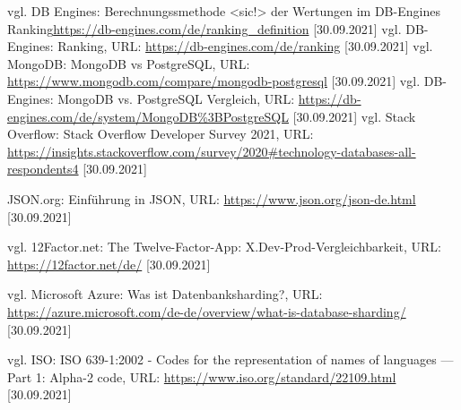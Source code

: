 \begin{thebibliography}{2}
         vgl. DB Engines: Berechnungssmethode <sic!> der Wertungen im DB-Engines Ranking\url{https://db-engines.com/de/ranking_definition} [30.09.2021]
         vgl. DB-Engines: Ranking, URL: \url{https://db-engines.com/de/ranking} [30.09.2021]
         vgl. MongoDB: MongoDB vs PostgreSQL, URL: \url{https://www.mongodb.com/compare/mongodb-postgresql} [30.09.2021]
         vgl. DB-Engines: MongoDB vs. PostgreSQL Vergleich, URL: \url{https://db-engines.com/de/system/MongoDB%3BPostgreSQL} [30.09.2021]
         vgl. Stack Overflow: Stack Overflow Developer Survey 2021, URL: \url{https://insights.stackoverflow.com/survey/2020#technology-databases-all-respondents4} [30.09.2021]
        
         JSON.org: Einführung in JSON, URL: \url{https://www.json.org/json-de.html} [30.09.2021]

         vgl. 12Factor.net: The Twelve-Factor-App: X.Dev-Prod-Vergleichbarkeit, URL: \url{https://12factor.net/de/} [30.09.2021]

         vgl. Microsoft Azure: Was ist Datenbanksharding?, URL: \url{https://azure.microsoft.com/de-de/overview/what-is-database-sharding/} [30.09.2021]

         vgl. ISO: ISO 639-1:2002 - Codes for the representation of names of languages — Part 1: Alpha-2 code, URL: \url{https://www.iso.org/standard/22109.html} [30.09.2021]

\end{thebibliography}